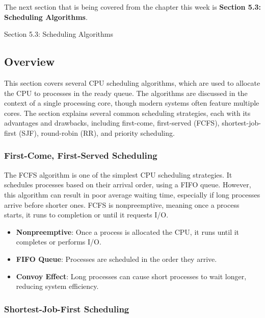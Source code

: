 The next section that is being covered from the chapter this week is \textbf{Section 5.3: Scheduling Algorithms}.

\begin{notes}{Section 5.3: Scheduling Algorithms}
    \subsection*{Overview}

    This section covers several CPU scheduling algorithms, which are used to allocate the CPU to processes in the ready queue. The algorithms are discussed in the context of a single processing core, 
    though modern systems often feature multiple cores. The section explains several common scheduling strategies, each with its advantages and drawbacks, including first-come, first-served (FCFS), 
    shortest-job-first (SJF), round-robin (RR), and priority scheduling.
    
    \subsubsection*{First-Come, First-Served Scheduling}
    
    The FCFS algorithm is one of the simplest CPU scheduling strategies. It schedules processes based on their arrival order, using a FIFO queue. However, this algorithm can result in poor average 
    waiting time, especially if long processes arrive before shorter ones. FCFS is nonpreemptive, meaning once a process starts, it runs to completion or until it requests I/O.
    
    \begin{highlight}
    
        \begin{itemize}
            \item \textbf{Nonpreemptive}: Once a process is allocated the CPU, it runs until it completes or performs I/O.
            \item \textbf{FIFO Queue}: Processes are scheduled in the order they arrive.
            \item \textbf{Convoy Effect}: Long processes can cause short processes to wait longer, reducing system efficiency.
        \end{itemize}
    
    \end{highlight}
    
    \subsubsection*{Shortest-Job-First Scheduling}
    

\end{notes}
